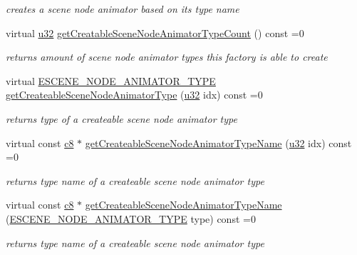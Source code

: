 \begin{DoxyCompactItemize}
\begin{DoxyCompactList}\small\item\em creates a scene node animator based on its type name \end{DoxyCompactList}\item 
\mbox{\label{classirr_1_1scene_1_1ISceneNodeAnimatorFactory_a7b6f10b1e602714652636763e8617691}} 
virtual \hyperlink{namespaceirr_a0416a53257075833e7002efd0a18e804}{u32} \hyperlink{classirr_1_1scene_1_1ISceneNodeAnimatorFactory_a7b6f10b1e602714652636763e8617691}{get\+Creatable\+Scene\+Node\+Animator\+Type\+Count} () const =0
\begin{DoxyCompactList}\small\item\em returns amount of scene node animator types this factory is able to create \end{DoxyCompactList}\item 
virtual \hyperlink{namespaceirr_1_1scene_a327a1e43872705cf8f3f3342fb307d19}{E\+S\+C\+E\+N\+E\+\_\+\+N\+O\+D\+E\+\_\+\+A\+N\+I\+M\+A\+T\+O\+R\+\_\+\+T\+Y\+PE} \hyperlink{classirr_1_1scene_1_1ISceneNodeAnimatorFactory_a6b423730b46154f5e0c3bcfd21e41755}{get\+Createable\+Scene\+Node\+Animator\+Type} (\hyperlink{namespaceirr_a0416a53257075833e7002efd0a18e804}{u32} idx) const =0
\begin{DoxyCompactList}\small\item\em returns type of a createable scene node animator type \end{DoxyCompactList}\item 
virtual const \hyperlink{namespaceirr_a9395eaea339bcb546b319e9c96bf7410}{c8} $\ast$ \hyperlink{classirr_1_1scene_1_1ISceneNodeAnimatorFactory_af33905c1ad6cd478bfbcbda33c82e3bd}{get\+Createable\+Scene\+Node\+Animator\+Type\+Name} (\hyperlink{namespaceirr_a0416a53257075833e7002efd0a18e804}{u32} idx) const =0
\begin{DoxyCompactList}\small\item\em returns type name of a createable scene node animator type \end{DoxyCompactList}\item 
virtual const \hyperlink{namespaceirr_a9395eaea339bcb546b319e9c96bf7410}{c8} $\ast$ \hyperlink{classirr_1_1scene_1_1ISceneNodeAnimatorFactory_a905e896d9fbb0821dd4bf4214b786116}{get\+Createable\+Scene\+Node\+Animator\+Type\+Name} (\hyperlink{namespaceirr_1_1scene_a327a1e43872705cf8f3f3342fb307d19}{E\+S\+C\+E\+N\+E\+\_\+\+N\+O\+D\+E\+\_\+\+A\+N\+I\+M\+A\+T\+O\+R\+\_\+\+T\+Y\+PE} type) const =0
\begin{DoxyCompactList}\small\item\em returns type name of a createable scene node animator type \end{DoxyCompactList}\end{DoxyCompactItemize}
